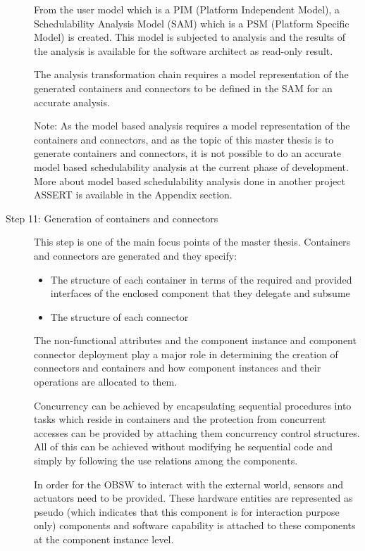 \begin{description}
From the user model which is a PIM (Platform Independent Model), a Schedulability Analysis Model (SAM) which is a PSM (Platform Specific Model) is created. This model is subjected to analysis and the results of the analysis is available for the software architect as read-only result. 

The analysis transformation chain requires a model representation of the generated containers and connectors to be defined in the SAM for an accurate analysis.

Note: As the model based analysis requires a model representation of the containers and connectors, and as the topic of this master thesis is to generate containers and connectors, it is not possible to do an accurate model based schedulability analysis at the current phase of development. More about model based schedulability analysis done in another project ASSERT is available in the Appendix section.

\item [Step 11: Generation of containers and connectors]  This step is one of the main focus points of the master thesis. Containers and connectors are generated and they specify:
\begin{itemize}
\item The structure of each container in terms of the required and provided interfaces of the enclosed component that they delegate and subsume
\item The structure of each connector 
\end{itemize} 
The non-functional attributes and the component instance and component connector deployment play a major role in determining the creation of connectors and containers and how component instances and their operations are allocated to them.

Concurrency can be achieved by encapsulating sequential procedures into tasks which reside in containers and the protection from concurrent accesses can be provided by attaching them concurrency control structures. All of this can be achieved without modifying he sequential code and simply by following the use relations among the components.

In order for the OBSW to interact with the external world, sensors and actuators need to be provided. These hardware entities are represented as pseudo (which indicates that this component is for interaction purpose only) components and software capability is attached to these components at the component instance level.    
\end{description}

